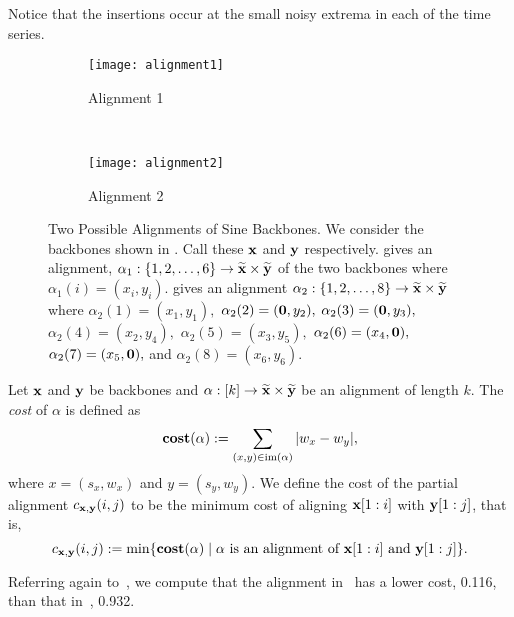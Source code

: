  Notice that the insertions occur at the small noisy extrema in
each of the time series.

\begin{figure}[htp]
    \centering
    \begin{subfigure}[b]{\textwidth}
        \centering
        \texttt{[image: alignment1]}
        \caption{Alignment 1}
        \label{fig:alignment1}
    \end{subfigure} \\
    \begin{subfigure}[b]{\textwidth}
        \centering
        \texttt{[image: alignment2]}
        \caption{Alignment 2}
        \label{fig:alignment2}
    \end{subfigure}
    \caption{Two Possible Alignments of Sine Backbones. We consider the
        backbones shown in . Call these $\textbf{x}$ and $\textbf{y}$
        respectively.  gives an alignment, $\alpha_1: \{1, 2,
        \dots, 6\} \rightarrow \widetilde{\textbf{x}} \times \widetilde{\textbf{y}}$ of the two
        backbones where $\alpha_1(i) = (x_i, y_i)$.  gives an
        alignment $\alpha_2: \{1, 2, \dots, 8\}\rightarrow \widetilde{\textbf{x}} \times
        \widetilde{\textbf{y}}$ where $\alpha_2(1) = (x_1, y_1),$ $\alpha_2(2) = ({\mathbf{0}}, y_2),$
        $\alpha_2(3) = ({\mathbf{0}}, y_3),$ $\alpha_2(4) = (x_2, y_4),$
        $\alpha_2(5)=(x_3, y_5),$  $\alpha_2(6) = (x_4, {\mathbf{0}}),$ $\alpha_2(7) =
        (x_5, {\mathbf{0}}),$ and $\alpha_2(8) = (x_6, y_6)$.} \label{fig:alignments}
\end{figure}

\begin{defn}\label{def:cost}
    Let $\textbf{x}$ and $\textbf{y}$ be backbones and $\alpha:[k] \rightarrow \widetilde{\textbf{x}} \times \widetilde{\textbf{y}}$ be an
    alignment of length $k$. The \textit{cost} of $\alpha$ is defined as
    $$
        \textbf{cost}(\alpha) := \sum_{(x,y) \in \operatorname{im}(\alpha)}
        |w_x-w_y|,
    $$
    where $x=(s_x,w_x)$ and $y=(s_y,w_y)$.
    We define the cost of the partial alignment $c_{\textbf{x}, \textbf{y}}(i,j)$ to be the minimum cost of aligning $\textbf{x}[1:i]$
    with $\textbf{y}[1:j]$, that is,
    $$
        c_{\textbf{x}, \textbf{y}}(i, j)
        :=
        \min\{ \textbf{cost}(\alpha) \mid \alpha \text{ is an alignment of } \textbf{x}[1:i] \text{ and } \textbf{y}[1:j] \}.
    $$
\end{defn}

Referring again to~, we compute that the alignment
in~ has a lower cost, 0.116, than that
in~, 0.932.

